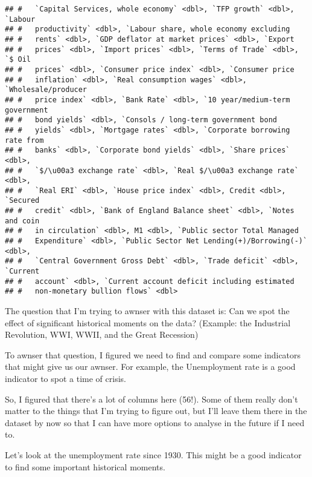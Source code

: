 \documentclass[]{article}
\begin{document}
\begin{verbatim}
## #   `Capital Services, whole economy` <dbl>, `TFP growth` <dbl>, `Labour
## #   productivity` <dbl>, `Labour share, whole economy excluding
## #   rents` <dbl>, `GDP deflator at market prices` <dbl>, `Export
## #   prices` <dbl>, `Import prices` <dbl>, `Terms of Trade` <dbl>, `$ Oil
## #   prices` <dbl>, `Consumer price index` <dbl>, `Consumer price
## #   inflation` <dbl>, `Real consumption wages` <dbl>, `Wholesale/producer
## #   price index` <dbl>, `Bank Rate` <dbl>, `10 year/medium-term government
## #   bond yields` <dbl>, `Consols / long-term government bond
## #   yields` <dbl>, `Mortgage rates` <dbl>, `Corporate borrowing rate from
## #   banks` <dbl>, `Corporate bond yields` <dbl>, `Share prices` <dbl>,
## #   `$/\u00a3 exchange rate` <dbl>, `Real $/\u00a3 exchange rate` <dbl>,
## #   `Real ERI` <dbl>, `House price index` <dbl>, Credit <dbl>, `Secured
## #   credit` <dbl>, `Bank of England Balance sheet` <dbl>, `Notes and coin
## #   in circulation` <dbl>, M1 <dbl>, `Public sector Total Managed
## #   Expenditure` <dbl>, `Public Sector Net Lending(+)/Borrowing(-)` <dbl>,
## #   `Central Government Gross Debt` <dbl>, `Trade deficit` <dbl>, `Current
## #   account` <dbl>, `Current account deficit including estimated
## #   non-monetary bullion flows` <dbl>
\end{verbatim}

The question that I'm trying to awnser with this dataset is: Can we spot
the effect of significant historical moments on the data? (Example: the
Industrial Revolution, WWI, WWII, and the Great Recession)

To awnser that question, I figured we need to find and compare some
indicators that might give us our awnser. For example, the Unemployment
rate is a good indicator to spot a time of crisis.

So, I figured that there's a lot of columns here (56!). Some of them
really don't matter to the things that I'm trying to figure out, but
I'll leave them there in the dataset by now so that I can have more
options to analyse in the future if I need to.

Let's look at the unemployment rate since 1930. This might be a good
indicator to find some important historical moments.
\end{document}

